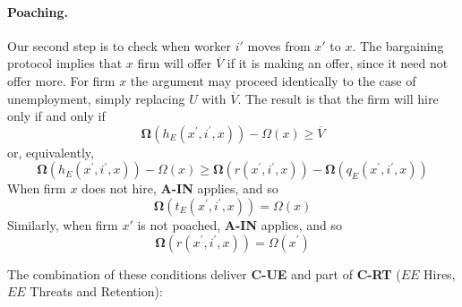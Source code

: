\paragraph{Poaching.} Our second step is to check when worker $i'$ moves from $x'$ to $x$. The bargaining protocol implies that $x$ firm will offer $%
\overline{V}$ if it is making an offer, since it need not offer more. For firm $x$
the argument may proceed identically to the case of unemployment, simply
replacing $U$ with $\overline{V}.$ The result is that the firm will hire only if and only if
\begin{equation*}
\boldsymbol{\Omega }\left( h_{E}\left( x^{\prime },i^{\prime },x\right) \right)
-\Omega\left( x\right) \geq \overline{V}
\end{equation*}%
or, equivalently,
\begin{equation*}
\boldsymbol{\Omega }\left( h_{E}\left( x^{\prime },i^{\prime },x\right) \right)
-\Omega \left( x\right) \geq \boldsymbol{\Omega} \left(
r(x^{\prime},i^{\prime},x)\right) -\boldsymbol{\Omega }\left( q_{E}\left(
x^{\prime },i^{\prime },x\right) \right)
\end{equation*}
When firm $x$ does not hire, \textbf{A-IN} applies, and so
\begin{equation*}
\boldsymbol{\Omega}(t_E(x^{\prime},i^{\prime},x)) = \Omega(x)
\end{equation*}
Similarly, when firm $x'$ is not poached, \textbf{A-IN} applies, and so
\begin{equation*}
\boldsymbol{\Omega}(r(x^{\prime},i^{\prime},x)) = \Omega(x^{\prime})
\end{equation*}

The combination of these conditions deliver \textbf{C-UE} and part of
\textbf{C-RT} ($EE$ Hires, $EE$ Threats and Retention):

